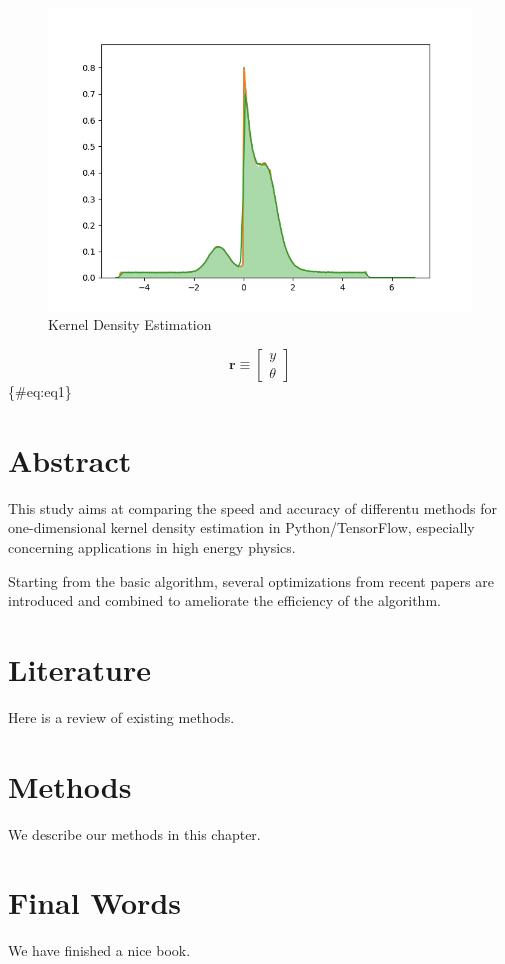 \documentclass[
  12pt,
  english,
  a4paper,
,tablecaptionabove
]{scrartcl}
\begin{document}
\begin{figure}
\hypertarget{fig:kde}{%
\centering
\includegraphics{plots/kde.png}
\caption{Kernel Density Estimation}\label{fig:kde}
}
\end{figure}

\[
\mathbf{r} \equiv \begin{bmatrix}
y \\
\theta
\end{bmatrix}
\] \{\#eq:eq1\}

\hypertarget{abstract-1}{%
\section{Abstract}\label{abstract-1}}

This study aims at comparing the speed and accuracy of differentu methods for one-dimensional kernel density estimation in Python/TensorFlow, especially concerning applications in high energy physics.

Starting from the basic algorithm, several optimizations from recent papers are introduced and combined to ameliorate the efficiency of the algorithm.

\hypertarget{literature}{%
\section{Literature}\label{literature}}

Here is a review of existing methods.

\hypertarget{methods-1}{%
\section{Methods}\label{methods-1}}

We describe our methods in this chapter.

\hypertarget{final-words}{%
\section{Final Words}\label{final-words}}

We have finished a nice book.


\listoftables
\listoffigures
\lstlistoflistings
\end{document}
